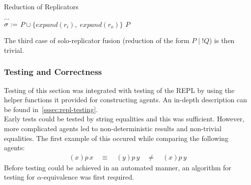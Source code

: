         \begin{breakablealgorithm}
            \caption{Reduction of Replicators}
            \begin{algorithmic}[1]
                        \State$\ldots$
                    \EndFor\\

                     
                                \State$\sigma :=$  
                                    \State\Return$P \cup \{expand(r_i), \; expand(r_o)\}$ 
                                \EndIf
                            \EndIf
                        \EndFor
                    \EndFor
                    \State\Return$P$
                \EndFunction
            \end{algorithmic}
        \end{breakablealgorithm}

        The third case of solo-replicator fusion (reduction of the form $P \;|\; !Q$) is then trivial.


    \subsubsection{Testing and Correctness}
        Testing of this section was integrated with testing of the REPL by using the helper functions it provided for constructing agents.
        An in-depth description can be found in~\ref{sssec:repl-testing}. \\
        
        Early tests could be tested by string equalities and this was sufficient.
        However, more complicated agents led to non-deterministic results and non-trivial equalities.
        The first example of this occured while comparing the following agents:
        \begin{align*}
            (x) p \, x \quad\equiv\quad (y) p \, y \quad\neq\quad (x) p \, y
        \end{align*}
        Before testing could be achieved in an automated manner, an algorithm for testing for $\alpha$-equivalence was first required.\\

